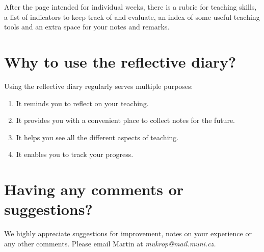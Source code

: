 After the page intended for individual weeks, there is a rubric for teaching skills, a list of indicators to keep track of and evaluate, an index of some useful teaching tools and an extra space for your notes and remarks.

\section*{Why to use the reflective diary?}

Using the reflective diary regularly serves multiple purposes:
\begin{enumerate}[topsep=0pt]
\item It reminds you to reflect on your teaching.
\item It provides you with a convenient place to collect notes for the future.
\item It helps you see all the different aspects of teaching.
\item It enables you to track your progress.
\end{enumerate}

\section*{Having any comments or suggestions?}

We highly appreciate suggestions for improvement, notes on your experience or any other comments. Please email Martin at \textit{mukrop@mail.muni.cz.}
